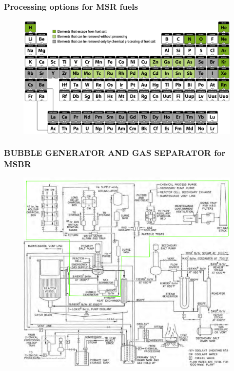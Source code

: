 \documentclass[9pt,handout]{beamer}
\begin{document}
\begin{frame}
  \frametitle{Processing options for \gls{MSR} fuels}
               \begin{figure}[t]
                \vspace*{-0.1in}
			\hspace{-0.3in}
                \includegraphics[height=0.6\textwidth]{./images/periodic_map.png}
               \end{figure}
              
\end{frame}

\begin{frame}
  \frametitle{BUBBLE GENERATOR AND GAS SEPARATOR for \gls{MSBR}}
               \begin{figure}[t]
                \vspace*{-0.1in}
                \includegraphics[height=0.7\textwidth]{./images/gas_separation.png}
               \end{figure}
              
\end{frame}
\end{document}
